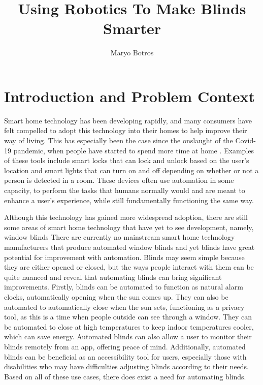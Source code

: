 \documentclass[10pt,twocolumn]{article}
\title{Using Robotics To Make Blinds Smarter}
\author{Maryo Botros}
\affiliation{Occidental College}
\begin{document}
\maketitle

\section{Introduction and Problem Context}

Smart home technology has been developing rapidly, and many consumers have felt compelled to adopt this technology into their homes to help improve their way of living. This has especially been the case since the onslaught of the Covid-19 pandemic, when people have started to spend more time at home \cite{Ghosh2021SmartHomeDevice}. Examples of these tools include smart locks that can lock and unlock based on the user's location and smart lights that can turn on and off depending on whether or not a person is detected in a room. These devices often use automation in some capacity, to perform the tasks that humans normally would and are meant to enhance a user’s experience, while still fundamentally functioning the same way.

Although this technology has gained more widespread adoption, there are still some areas of smart home technology that have yet to see development, namely, window blinds There are currently no mainstream smart home technology manufacturers that produce automated window blinds and yet blinds have great potential for improvement with automation. Blinds may seem simple because they are either opened or closed, but the ways people interact with them can be quite nuanced and reveal that automating blinds can bring significant improvements. Firstly, blinds can be automated to function as natural alarm clocks, automatically opening when the sun comes up. They can also be automated to automatically close when the sun sets, functioning as a privacy tool, as this is a time when people outside can see through a window. They can be automated to close at high temperatures to keep indoor temperatures cooler, which can save energy. Automated blinds can also allow a user to monitor their blinds remotely from an app, offering peace of mind. Additionally, automated blinds can be beneficial as an accessibility tool for users, especially those with disabilities who may have difficulties adjusting blinds according to their needs. Based on all of these use cases, there does exist a need for automating blinds.
\end{document}
